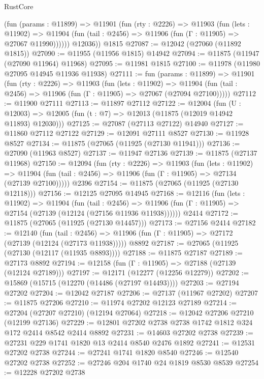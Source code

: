 \begin{lexlean}{RustCore}
\begin{coremodule}
          (fun (params : @11899) =>
          @11901
            (fun (rty : @2226) =>
            @11903
              (fun (lets : @11902) =>
              @11904 (fun (tail : @2456) => @11906 (fun (Γ : @11905) => @27067 @11990))))))
        @12036))
    @1815
@27087 := @12042 (@27060 (@11892 @1815))
@27090 := @11955 (@11956 @1815) @14942
@27094 := @11875 (@11947 (@27090 @11964) @11968)
@27095 := @11981 @1815
@27100 := @11978 (@11980 @27095 @14945 @11936 @11938)
@27111 := fun (params : @11899) =>
  @11901
    (fun (rty : @2226) =>
    @11903
      (fun (lets : @11902) =>
      @11904 (fun (tail : @2456) => @11906 (fun (Γ : @11905) => @27067 (@27094 @27100)))))
@27112 := @11900 @27111
@27113 := @11897 @27112
@27122 := @12004
    (fun (U : @12003) => @12005 (fun (t : @7) => @12013 (@11875 (@12019 @14942 @11893) @12030)))
@27125 := @27087 (@27113 @27122) @14940
@27127 := @11860 @27112 @27122
@27129 := @12091 @27111 @8527
@27130 := @11928 @8527
@27134 := @11875 (@27065 (@11925 (@27130 @11941)))
@27136 := @27090 (@11963 @8527)
@27137 := @11947 @27136
@27139 := @11875 (@27137 @11968)
@27150 := @12094
    (fun (rty : @2226) =>
    @11903
      (fun (lets : @11902) =>
      @11904 (fun (tail : @2456) => @11906 (fun (Γ : @11905) => @27134 (@27139 @27100)))))
    @2396
@27154 := @11875 (@27065 (@11925 (@27130 @12118)))
@27156 := @12125 @27095 @14945
@27168 := @12116
    (fun (lets : @11902) =>
    @11904
      (fun (tail : @2456) =>
      @11906 (fun (Γ : @11905) => @27154 (@27139 (@12124 (@27156 @11936 @11938))))))
    @2414
@27172 := @11875 (@27065 (@11925 (@27130 @14457)))
@27173 := @27156 @2414
@27182 := @12140
    (fun (tail : @2456) => @11906 (fun (Γ : @11905) => @27172 (@27139 (@12124 (@27173 @11938)))))
    @8892
@27187 := @27065 (@11925 (@27130 (@12117 (@11935 @8893))))
@27188 := @11875 @27187
@27189 := @27173 @8892
@27194 := @12158 (fun (Γ : @11905) => @27188 (@27139 (@12124 @27189)))
@27197 := @12171 (@12277 (@12256 @12279))
@27202 := @15869 (@15715 (@12270 (@14486 (@27197 @14493))))
@27203 := @27194 @27202
@27204 := @12042 @27187
@27206 := @27137 (@11967 @27202)
@27207 := @11875 @27206
@27210 := @11974 @27202 @12123 @27189
@27214 := @27204 (@27207 @27210) (@12194 @27064)
@27218 := @12042 @27206 @27210 (@12199 @27136)
@27229 := @12801 @27202 @2738 @2738 @1742 @1812 @324 @172 @2414 @8542 @2414 @8892
@27231 := @14603 @27202 @2738
@27239 := @27231 @229 @1741 @1820 @13 @2414 @8540 @2476 @1892
@27241 := @12531 @27202 @2738
@27244 := @27241 @1741 @1820 @8540
@27246 := @12540 @27202 @2738
@27252 := @27246 @204 @1740 @24 @1819 @8530 @8539
@27254 := @12228 @27202 @2738

\end{coremodule}
\end{lexlean}
